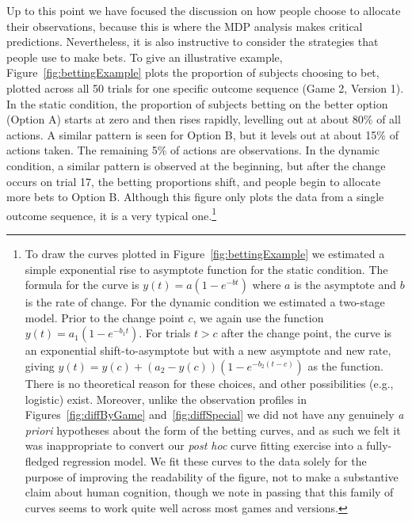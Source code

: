 \documentclass[authoryear]{elsarticle}
\begin{document}
Up to this point we have focused the discussion on how people choose to allocate their observations, because this is where the MDP analysis makes critical predictions. Nevertheless, it is also instructive to consider the strategies that people use to make bets. To give an illustrative example, Figure~\ref{fig:bettingExample} plots the proportion of subjects choosing to bet, plotted across all 50 trials for one specific outcome sequence (Game 2, Version 1). In the static condition, the proportion of subjects betting on the better option (Option A) starts at zero and then rises rapidly, levelling out at about 80\% of all actions. A similar pattern is seen for Option B, but it levels out at about 15\% of actions taken. The remaining 5\% of actions are observations. In the dynamic condition, a similar pattern is observed at the beginning, but after the change occurs on trial 17, the betting proportions shift, and people begin to allocate more bets to Option B. Although this figure only plots the data from a single outcome sequence, it is a very typical one.\footnote{To draw the curves plotted in Figure~\ref{fig:bettingExample} we estimated a simple exponential rise to asymptote function for the static condition. The formula for the curve is $y(t)=a(1 - e^{-bt})$ where $a$ is the asymptote and $b$ is the rate of change. For the dynamic condition we estimated a two-stage model. Prior to the change point $c$, we again use the function $y(t)=a_1(1 - e^{-b_1t})$. For trials $t>c$ after the change point, the curve is an exponential shift-to-asymptote but with a new asymptote and new rate, giving $y(t) = y(c) + (a_2 - y(c))(1-e^{-b_2(t-c)})$ as the function. There is no theoretical reason for these choices, and other possibilities (e.g., logistic) exist. Moreover, unlike the observation profiles in Figures~\protect\ref{fig:diffByGame} and~\protect\ref{fig:diffSpecial} we did not have any genuinely {\it a priori} hypotheses about the form of the betting curves, and as such we felt it was inappropriate to convert our {\it post hoc} curve fitting exercise into a fully-fledged regression model. We fit these curves to the data solely for the purpose of improving the readability of the figure, not to make a substantive claim about human cognition, though we note in passing that this family of curves seems to work quite well across most games and versions.}
\end{document}
